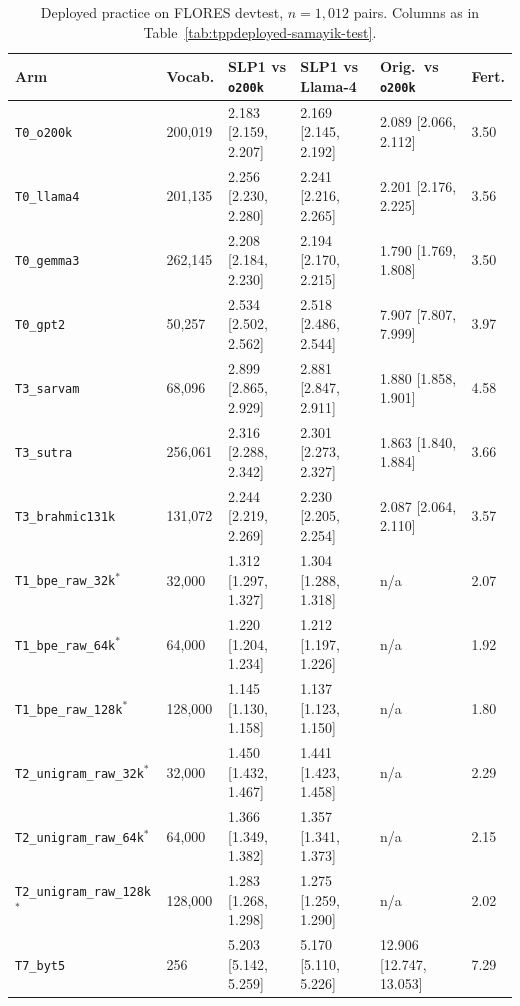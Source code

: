 \begin{table}[t]
\centering
\scriptsize
\begin{tabular}{llllll}
\toprule
Arm & Vocab. & SLP1 vs \texttt{o200k} & SLP1 vs Llama-4 & Orig.\ vs \texttt{o200k} & Fert. \\
\midrule
\texttt{T0\_o200k} & 200,019 & 2.183 [2.159, 2.207] & 2.169 [2.145, 2.192] & 2.089 [2.066, 2.112] & 3.50 \\
\texttt{T0\_llama4} & 201,135 & 2.256 [2.230, 2.280] & 2.241 [2.216, 2.265] & 2.201 [2.176, 2.225] & 3.56 \\
\texttt{T0\_gemma3} & 262,145 & 2.208 [2.184, 2.230] & 2.194 [2.170, 2.215] & 1.790 [1.769, 1.808] & 3.50 \\
\texttt{T0\_gpt2} & 50,257 & 2.534 [2.502, 2.562] & 2.518 [2.486, 2.544] & 7.907 [7.807, 7.999] & 3.97 \\
\texttt{T3\_sarvam} & 68,096 & 2.899 [2.865, 2.929] & 2.881 [2.847, 2.911] & 1.880 [1.858, 1.901] & 4.58 \\
\texttt{T3\_sutra} & 256,061 & 2.316 [2.288, 2.342] & 2.301 [2.273, 2.327] & 1.863 [1.840, 1.884] & 3.66 \\
\texttt{T3\_brahmic131k} & 131,072 & 2.244 [2.219, 2.269] & 2.230 [2.205, 2.254] & 2.087 [2.064, 2.110] & 3.57 \\
\texttt{T1\_bpe\_raw\_32k}$^{*}$ & 32,000 & 1.312 [1.297, 1.327] & 1.304 [1.288, 1.318] & n/a & 2.07 \\
\texttt{T1\_bpe\_raw\_64k}$^{*}$ & 64,000 & 1.220 [1.204, 1.234] & 1.212 [1.197, 1.226] & n/a & 1.92 \\
\texttt{T1\_bpe\_raw\_128k}$^{*}$ & 128,000 & 1.145 [1.130, 1.158] & 1.137 [1.123, 1.150] & n/a & 1.80 \\
\texttt{T2\_unigram\_raw\_32k}$^{*}$ & 32,000 & 1.450 [1.432, 1.467] & 1.441 [1.423, 1.458] & n/a & 2.29 \\
\texttt{T2\_unigram\_raw\_64k}$^{*}$ & 64,000 & 1.366 [1.349, 1.382] & 1.357 [1.341, 1.373] & n/a & 2.15 \\
\texttt{T2\_unigram\_raw\_128k}$^{*}$ & 128,000 & 1.283 [1.268, 1.298] & 1.275 [1.259, 1.290] & n/a & 2.02 \\
\texttt{T7\_byt5} & 256 & 5.203 [5.142, 5.259] & 5.170 [5.110, 5.226] & 12.906 [12.747, 13.053] & 7.29 \\
\bottomrule
\end{tabular}
\caption{Deployed practice on FLORES devtest, $n=1{,}012$ pairs. Columns as in Table~\ref{tab:tppdeployed-samayik-test}.}
\label{tab:tppdeployed-flores-devtest}
\end{table}

